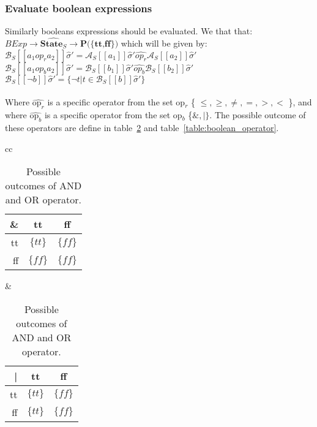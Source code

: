 \subsubsection{Evaluate boolean expressions}
Similarly booleans expressions should be evaluated. We that that:\\
$BExp \rightarrow \widehat{\textbf{State}_S} \rightarrow \textbf{P(\{tt,ff\})}$ which will be given by:\\
$\mathcal{B}_S [\![a_1op_ra_2]\!]\widehat{\sigma}' = \mathcal{A}_S [\![a_1]\!]\widehat{\sigma}'\widehat{op_r}\mathcal{A}_S [\![a_2]\!]\widehat{\sigma}'$\\
$\mathcal{B}_S [\![a_1op_ba_2]\!]\widehat{\sigma}' = \mathcal{B}_S [\![b_1]\!]\widehat{\sigma}'\widehat{op_b}\mathcal{B}_S [\![b_2]\!]\widehat{\sigma}'$\\
$\mathcal{B}_S [\![\neg b]\!]\widehat{\sigma}' =\{\neg t|t\in \mathcal{B}_S[\![b]\!]\widehat{\sigma}'\}$\\
\\
Where $\widehat{\text{op}_r}$ is a specific  operator from the set op$_r$ \{ $\leq,\geq,\neq,=,>,<$ \}, and where $\widehat{\text{op}_b}$ is a specific operator from the set op$_b$ \{$\&,|\}$. The possible outcome of these operators are define in table~\ref{table:or_operator} and table~\ref{table:boolean_operator}.

\begin{table}
\begin{tabular}{cc}
    \begin{minipage}{0.3\linewidth}
		\begin{tabular}{| r | c | c |}
		\hline
		 \&   & tt   & ff  \\
		\hline
		 tt  & $\{tt\}$ & $\{ff\}$  \\
		\hline
		 ff  & $\{ff\}$ & $\{ff\}$ \\
		\hline
		\end{tabular}
    \end{minipage} &

    \begin{minipage}{0.3\linewidth}
		\begin{tabular}{| r | c | c |}
		\hline
		 |   & tt   & ff  \\
		\hline
		 tt  & $\{tt\}$ & $\{ff\}$  \\
		\hline
		 ff  & $\{tt\}$ & $\{ff\}$ \\
		\hline
		\end{tabular}
    \end{minipage}
\end{tabular}
\centering
\caption{Possible outcomes of AND and OR operator.}
\label{table:or_operator}
\end{table}


